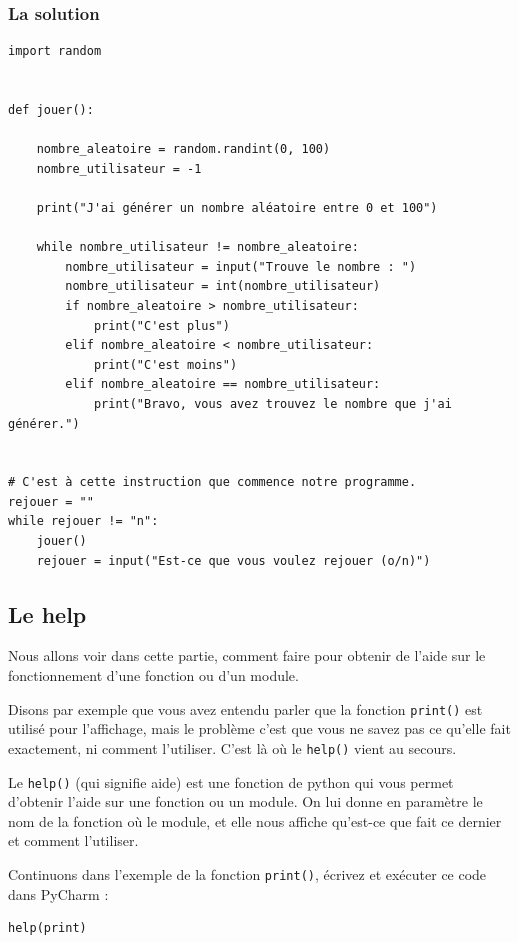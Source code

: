 \documentclass[12pt]{article}
\newcommand{\code}[1]{\colorbox{light-gray}{\texttt{#1}}}
\begin{document}
        \subsubsection{La solution}
        \begin{lstlisting}[style=code, breaklines=false]
import random


def jouer():

    nombre_aleatoire = random.randint(0, 100)
    nombre_utilisateur = -1

    print("J'ai générer un nombre aléatoire entre 0 et 100")

    while nombre_utilisateur != nombre_aleatoire:
        nombre_utilisateur = input("Trouve le nombre : ")
        nombre_utilisateur = int(nombre_utilisateur)
        if nombre_aleatoire > nombre_utilisateur:
            print("C'est plus")
        elif nombre_aleatoire < nombre_utilisateur:
            print("C'est moins")
        elif nombre_aleatoire == nombre_utilisateur:
            print("Bravo, vous avez trouvez le nombre que j'ai générer.")


# C'est à cette instruction que commence notre programme.
rejouer = ""
while rejouer != "n":
    jouer()
    rejouer = input("Est-ce que vous voulez rejouer (o/n)") 
        \end{lstlisting}
    \subsection{Le help}
        Nous allons voir dans cette partie, comment faire pour obtenir de l'aide sur le fonctionnement d'une fonction
        ou d'un module.

        Disons par exemple que vous avez entendu parler que la fonction \code{print()} est utilisé pour l'affichage,
        mais le problème c'est que vous ne savez pas ce qu'elle fait exactement, ni comment l'utiliser. C'est là où 
        le \code{help()} vient au secours.

        Le \code{help()} (qui signifie aide) est une fonction de python qui vous permet d'obtenir l'aide sur une 
        fonction ou un module. On lui donne en paramètre le nom de la fonction où le module, et elle nous affiche
        qu'est-ce que fait ce dernier et comment l'utiliser.

        Continuons dans l'exemple de la fonction \code{print()}, écrivez et exécuter ce code dans PyCharm :
        \begin{lstlisting}[style=code]
help(print)
        \end{lstlisting}
\end{document}

